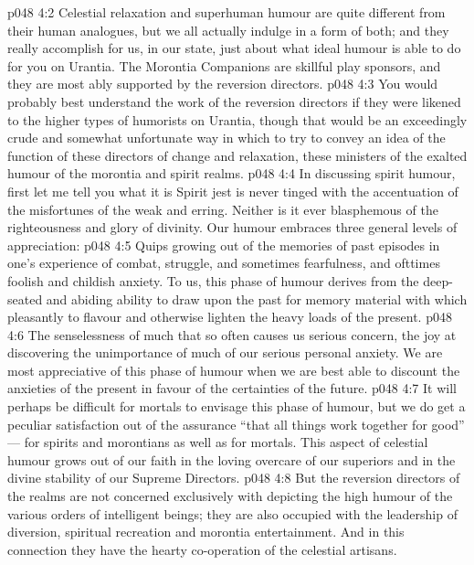 \vs p048 4:2 Celestial relaxation and superhuman humour are quite different from their human analogues, but we all actually indulge in a form of both; and they really accomplish for us, in our state, just about what ideal humour is able to do for you on Urantia. The Morontia Companions are skillful play sponsors, and they are most ably supported by the reversion directors.
\vs p048 4:3 You would probably best understand the work of the reversion directors if they were likened to the higher types of humorists on Urantia, though that would be an exceedingly crude and somewhat unfortunate way in which to try to convey an idea of the function of these directors of change and relaxation, these ministers of the exalted humour of the morontia and spirit realms.
\vs p048 4:4 \pc In discussing spirit humour, first let me tell you what it is  Spirit jest is never tinged with the accentuation of the misfortunes of the weak and erring. Neither is it ever blasphemous of the righteousness and glory of divinity. Our humour embraces three general levels of appreciation:
\vs p048 4:5 \bibnobreakspace {} Quips growing out of the memories of past episodes in one’s experience of combat, struggle, and sometimes fearfulness, and ofttimes foolish and childish anxiety. To us, this phase of humour derives from the deep\hyp{}seated and abiding ability to draw upon the past for memory material with which pleasantly to flavour and otherwise lighten the heavy loads of the present.
\vs p048 4:6 \bibnobreakspace {} The senselessness of much that so often causes us serious concern, the joy at discovering the unimportance of much of our serious personal anxiety. We are most appreciative of this phase of humour when we are best able to discount the anxieties of the present in favour of the certainties of the future.
\vs p048 4:7 \bibnobreakspace {} It will perhaps be difficult for mortals to envisage this phase of humour, but we do get a peculiar satisfaction out of the assurance “that all things work together for good” --- for spirits and morontians as well as for mortals. This aspect of celestial humour grows out of our faith in the loving overcare of our superiors and in the divine stability of our Supreme Directors.
\vs p048 4:8 \pc But the reversion directors of the realms are not concerned exclusively with depicting the high humour of the various orders of intelligent beings; they are also occupied with the leadership of diversion, spiritual recreation and morontia entertainment. And in this connection they have the hearty co\hyp{}operation of the celestial artisans.
